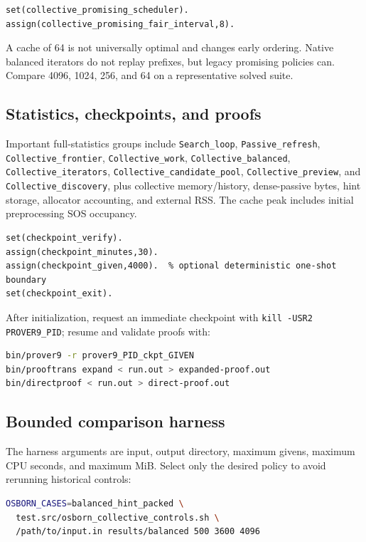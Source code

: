 \documentclass[11pt]{article}
\newcommand{\setting}[1]{\texttt{#1}}
\begin{document}
\begin{lstlisting}
set(collective_promising_scheduler).
assign(collective_promising_fair_interval,8).
\end{lstlisting}

A cache of 64 is not universally optimal and changes early ordering.  Native
balanced iterators do not replay prefixes, but legacy promising policies can.
Compare 4096, 1024, 256, and 64 on a representative solved suite.

\subsection{Statistics, checkpoints, and proofs}

Important full-statistics groups include \setting{Search\_loop},
\setting{Passive\_refresh}, \setting{Collective\_frontier},
\setting{Collective\_work}, \setting{Collective\_balanced},
\setting{Collective\_iterators}, \setting{Collective\_candidate\_pool},
\setting{Collective\_preview}, and \setting{Collective\_discovery}, plus
collective memory/history, dense-passive bytes, hint storage, allocator
accounting, and external RSS.  The cache peak includes initial preprocessing
SOS occupancy.

\begin{lstlisting}
set(checkpoint_verify).
assign(checkpoint_minutes,30).
assign(checkpoint_given,4000).  % optional deterministic one-shot boundary
set(checkpoint_exit).
\end{lstlisting}

After initialization, request an immediate checkpoint with
\setting{kill -USR2 PROVER9\_PID}; resume and validate proofs with:

\begin{lstlisting}[language=bash]
bin/prover9 -r prover9_PID_ckpt_GIVEN
bin/prooftrans expand < run.out > expanded-proof.out
bin/directproof < run.out > direct-proof.out
\end{lstlisting}

\subsection{Bounded comparison harness}

The harness arguments are input, output directory, maximum givens, maximum
CPU seconds, and maximum MiB.  Select only the desired policy to avoid
rerunning historical controls:

\begin{lstlisting}[language=bash]
OSBORN_CASES=balanced_hint_packed \
  test.src/osborn_collective_controls.sh \
  /path/to/input.in results/balanced 500 3600 4096
\end{lstlisting}
\end{document}
